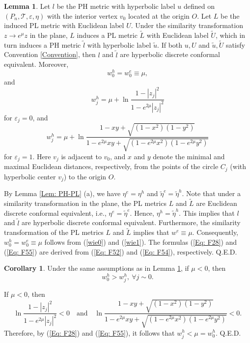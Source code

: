 \documentclass[12pt]{amsart}
\theoremstyle{definition}
\newtheorem{lemma}[theorem]{Lemma}
\newtheorem{corollary}[theorem]{Corollary}
\def\qed{\hfill{Q.E.D.}\smallskip}
\begin{document}
\begin{lemma}\label{Lem: relation}
Let $l$ be the PH metric with hyperbolic label $u$ defined on $(P_n, \mathcal{T}, \varepsilon, \eta)$ with the interior vertex $v_0$ located at the origin $O$.
Let $L$ be the induced PL metric with Euclidean label $U$.
Under the similarity transformation $z \to e^{\mu} z$ in the plane, $L$ induces a PL metric $\tilde{L}$ with Euclidean label $\tilde{U}$, which in turn induces a PH metric $\tilde{l}$ with hyperbolic label $\tilde{u}$.
If both $u,U$ and $\tilde{u},\tilde{U}$ satisfy Convention \ref{Convention},
then $l$ and $\tilde{l}$ are hyperbolic discrete conformal equivalent.
Moreover, 
\begin{equation}
w^h_0=w_0^e\equiv\mu, 
\end{equation}
and
\begin{equation}\label{Eq: F28}
w^h_j=\mu+\ln \frac{1-|z_j|^2}{1-e^{2\mu}|z_j|^2}
\end{equation}
for $\varepsilon_j=0$, and
\begin{equation}\label{Eq: F55}
w^h_j=\mu+\ln \frac{1-xy+\sqrt{(1-x^2)(1-y^2)}}{1-e^{2\mu}xy +\sqrt{(1-e^{2\mu}x^2)(1-e^{2\mu}y^2)}}
\end{equation}
for $\varepsilon_j=1$.
Here $v_j$ is adjacent to $v_0$, and $x$ and $y$ denote the minimal and maximal Euclidean distances, respectively, from the points of the circle $C_j$ (with hyperbolic center $v_j$) to the origin $O$.
\end{lemma}
\proof
By Lemma \ref{Lem: PH-PL} (a), we have $\eta^e=\eta^h$ and $\tilde{\eta}^e=\tilde{\eta}^h$.
Note that under a similarity transformation in the plane, the PL metrics $L$ and $\tilde{L}$ are Euclidean discrete conformal equivalent, i.e., $\eta^e=\tilde{\eta}^e$. 
Hence, $\eta^h=\tilde{\eta}^h$.
This implies that $l$ and $\tilde{l}$ are hyperbolic discrete conformal equivalent.
Furthermore, the similarity transformation of the PL metrics $L$ and $\tilde{L}$ implies that $w^e\equiv\mu$.
Consequently, $w_0^h=w_0^e\equiv\mu$ follows from (\ref{wie0}) and (\ref{wie1}).
The formulas (\ref{Eq: F28}) and (\ref{Eq: F55}) are derived from (\ref{Eq: F52}) and (\ref{Eq: F54}), respectively.
\qed

\begin{corollary}\label{Cor: key}
Under the same assumptions as in Lemma \ref{Lem: relation}, if $\mu<0$, then
\begin{equation*}
w_0^h>w_j^h,\ \forall j\sim 0.
\end{equation*}
\end{corollary}
\proof
If $\mu<0$, then
\begin{equation*}
\ln \frac{1-|z_j|^2}{1-e^{2\mu}|z_j|^2}<0 \quad \text{and} \quad
\ln \frac{1-xy+\sqrt{(1-x^2)(1-y^2)}}{1-e^{2\mu}xy +\sqrt{(1-e^{2\mu}x^2)(1-e^{2\mu}y^2)}}<0.
\end{equation*}
Therefore, by (\ref{Eq: F28}) and (\ref{Eq: F55}), it follows that $w_j^h<\mu=w_0^h$.
\qed
\end{document}

